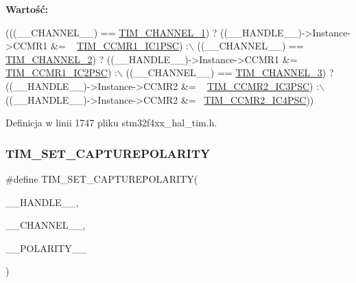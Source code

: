 {\bfseries Wartość\+:}
\begin{DoxyCode}
(((\_\_CHANNEL\_\_) == \hyperlink{group___t_i_m___channel_ga6b1541e4a49d62610899e24bf23f4879}{TIM\_CHANNEL\_1}) ? ((\_\_HANDLE\_\_)->Instance->CCMR1 &= ~
      \hyperlink{group___peripheral___registers___bits___definition_gab46b7186665f5308cd2ca52acfb63e72}{TIM\_CCMR1\_IC1PSC}) :\(\backslash\)
   ((\_\_CHANNEL\_\_) == \hyperlink{group___t_i_m___channel_ga33e02d43345a7ac5886f01b39e4f7ccd}{TIM\_CHANNEL\_2}) ? ((\_\_HANDLE\_\_)->Instance->CCMR1 &= ~
      \hyperlink{group___peripheral___registers___bits___definition_ga5e8e704f9ce5742f45e15e3b3126aa9d}{TIM\_CCMR1\_IC2PSC}) :\(\backslash\)
   ((\_\_CHANNEL\_\_) == \hyperlink{group___t_i_m___channel_ga4ea100c1789b178f3cb46721b7257e2d}{TIM\_CHANNEL\_3}) ? ((\_\_HANDLE\_\_)->Instance->CCMR2 &= ~
      \hyperlink{group___peripheral___registers___bits___definition_gafc3d11f2e968752bc9ec7131c986c3a6}{TIM\_CCMR2\_IC3PSC}) :\(\backslash\)
   ((\_\_HANDLE\_\_)->Instance->CCMR2 &= ~\hyperlink{group___peripheral___registers___bits___definition_ga6fd7591e2de10272f7fafb08cdd1b7b0}{TIM\_CCMR2\_IC4PSC}))
\end{DoxyCode}


Definicja w linii 1747 pliku stm32f4xx\+\_\+hal\+\_\+tim.\+h.

\mbox{\label{group___t_i_m___private___macros_ga4321d7371ca3a8c18f96e925667a7b2f}} 
\subsubsection{\texorpdfstring{T\+I\+M\+\_\+\+S\+E\+T\+\_\+\+C\+A\+P\+T\+U\+R\+E\+P\+O\+L\+A\+R\+I\+TY}{TIM\_SET\_CAPTUREPOLARITY}}
{\footnotesize\ttfamily \#define T\+I\+M\+\_\+\+S\+E\+T\+\_\+\+C\+A\+P\+T\+U\+R\+E\+P\+O\+L\+A\+R\+I\+TY(\begin{DoxyParamCaption}\item[{}]{\+\_\+\+\_\+\+H\+A\+N\+D\+L\+E\+\_\+\+\_\+,  }\item[{}]{\+\_\+\+\_\+\+C\+H\+A\+N\+N\+E\+L\+\_\+\+\_\+,  }\item[{}]{\+\_\+\+\_\+\+P\+O\+L\+A\+R\+I\+T\+Y\+\_\+\+\_\+ }\end{DoxyParamCaption})}

